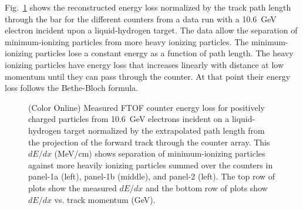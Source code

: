 \documentclass{elsart}
\begin{document}
Fig.~\ref{ftof-dedx} shows the reconstructed energy loss normalized by the track path length through
the bar for the different counters from a data run with a 10.6~GeV electron incident upon a liquid-hydrogen
target. The data allow the separation of minimum-ionizing particles from more heavy ionizing particles.
The minimum-ionizing particles lose a constant energy as a function of path length. The heavy ionizing
particles have energy loss that increases linearly with distance at low momentum until they can pass
through the counter. At that point their energy loss follows the Bethe-Bloch formula.

\begin{figure}[htbp]
\vspace{5.0cm}
\caption{(Color Online) Measured FTOF counter energy loss for positively charged particles from 10.6~GeV
electrons incident on a liquid-hydrogen target normalized by the extrapolated path length from the projection
of the forward track through the counter array. This $dE/dx$ (MeV/cm) shows separation of minimum-ionizing
particles against more heavily ionizing particles summed over the counters in panel-1a (left), panel-1b (middle),
and panel-2 (left). The top row of plots show the measured $dE/dx$ and the bottom row of plots show $dE/dx$
vs. track momentum (GeV).}
\label{ftof-dedx}
\end{figure}
\end{document}
